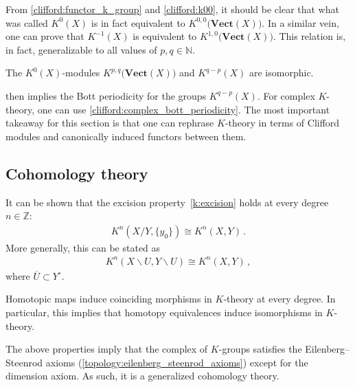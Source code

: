     From \cref{clifford:functor_k_group} and \cref{clifford:k00}, it should be clear that what was called $K^0(X)$ is in fact equivalent to $K^{0,0}\bigl(\mathbf{Vect}(X)\bigr)$. In a similar vein, one can prove that $K^{-1}(X)$ is equivalent to $K^{1,0}\bigl(\mathbf{Vect}(X)\bigr)$. This relation is, in fact, generalizable to all values of $p,q\in\mathbb{N}$.
    \begin{property}
        The $K^0(X)$-modules $K^{p,q}\bigl(\mathbf{Vect}(X)\bigr)$ and $K^{q-p}(X)$ are isomorphic.
    \end{property}

     then implies the Bott periodicity for the groups $K^{q-p}(X)$. For complex $K$-theory, one can use \cref{clifford:complex_bott_periodicity}. The most important takeaway for this section is that one can rephrase $K$-theory in terms of Clifford modules and canonically induced functors between them.

\subsection{Cohomology theory}

    \begin{property}[Excision]
        It can be shown that the excision property~\ref{k:excision} holds at every degree $n\in\mathbb{Z}$:
        \begin{gather}
            K^n(X/Y,\{y_0\})\cong K^n(X,Y)\,.
        \end{gather}
        More generally, this can be stated as
        \begin{gather}
            K^n(X\backslash U,Y\backslash U)\cong K^n(X,Y)\,,
        \end{gather}
        where $\overline{U}\subset Y^\circ$.
    \end{property}
    \begin{property}
        Homotopic maps induce coinciding morphisms in $K$-theory at every degree. In particular, this implies that homotopy equivalences induce isomorphisms in $K$-theory.
    \end{property}

    \begin{remark}
        The above properties imply that the complex of $K$-groups satisfies the Eilenberg--Steenrod axioms (\cref{topology:eilenberg_steenrod_axioms}) except for the dimension axiom. As such, it is a generalized cohomology theory.
    \end{remark}

